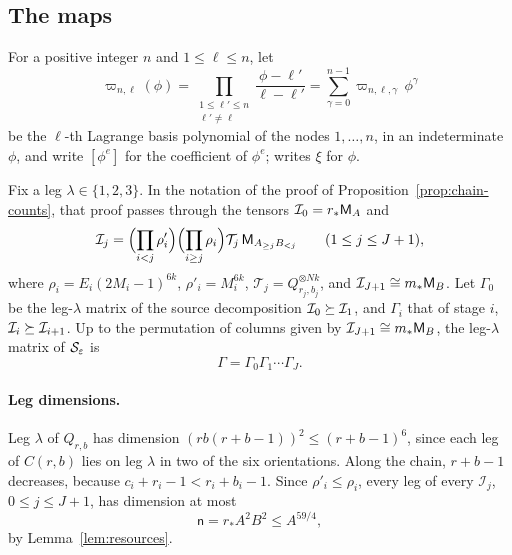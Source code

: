 \subsection{The maps}
\label{sec:coefficients-maps}

For a positive integer \(n\) and \(1\le\ell\le n\), let
\[
 \varpi_{n,\ell}(\phi)=\prod_{\substack{1\le\ell'\le n\\ \ell'\ne\ell}}
 \frac{\phi-\ell'}{\ell-\ell'}
 =\sum_{\gamma=0}^{n-1}\varpi_{n,\ell,\gamma}\,\phi^\gamma
\]
be the \(\ell\)-th Lagrange basis polynomial of the nodes
\(1,\ldots,n\), in an indeterminate \(\phi\), and write \([\phi^e]\) for
the coefficient of \(\phi^e\); \citep[Section~9.1]{FinCon26} writes
\(\xi\) for \(\phi\).

Fix a leg \(\lambda\in\{1,2,3\}\). In the notation of the proof of
Proposition~\ref{prop:chain-counts}, that proof passes through the
tensors \(\mathcal I_0=r_*\mathsf M_A\) and
\begin{equation}\label{eq:coef-intermediate}
 \mathcal I_j=\Bigl(\prod_{i<j}\rho'_i\Bigr)\Bigl(\prod_{i\ge j}\rho_i\Bigr)
 \mathcal T_j\,\mathsf M_{A_{\ge j}B_{<j}}
 \qquad(1\le j\le J+1),
\end{equation}
where \(\rho_i=E_i(2M_i-1)^{6k}\), \(\rho'_i=M_i^{6k}\),
\(\mathcal T_j=Q_{r_j,b_j}^{\otimes Nk}\), and
\(\mathcal I_{J+1}\cong m_*\mathsf M_B\). Let \(\Gamma_0\) be the leg-\(\lambda\)
matrix of the source decomposition \(\mathcal I_0\succeq\mathcal I_1\), and
\(\Gamma_i\) that of stage \(i\), \(\mathcal I_i\succeq\mathcal I_{i+1}\).
Up to the permutation of columns given by
\(\mathcal I_{J+1}\cong m_*\mathsf M_B\), the leg-\(\lambda\) matrix of
\(\mathcal S_\varepsilon\) is
\begin{equation}\label{eq:coef-product}
 \Gamma=\Gamma_0\Gamma_1\cdots\Gamma_J .
\end{equation}

\paragraph{Leg dimensions.}
Leg \(\lambda\) of \(Q_{r,b}\) has dimension \((rb(r+b-1))^2\le(r+b-1)^6\),
since each leg of \(C(r,b)\) lies on leg \(\lambda\) in two of the six
orientations. Along the chain, \(r+b-1\) decreases, because
\(c_i+r_i-1<r_i+b_i-1\). Since \(\rho'_i\le\rho_i\), every leg of every
\(\mathcal I_j\), \(0\le j\le J+1\), has dimension at most
\[
 \mathsf n=r_*A^2B^2\le A^{59/4},
\]
by Lemma~\ref{lem:resources}.

